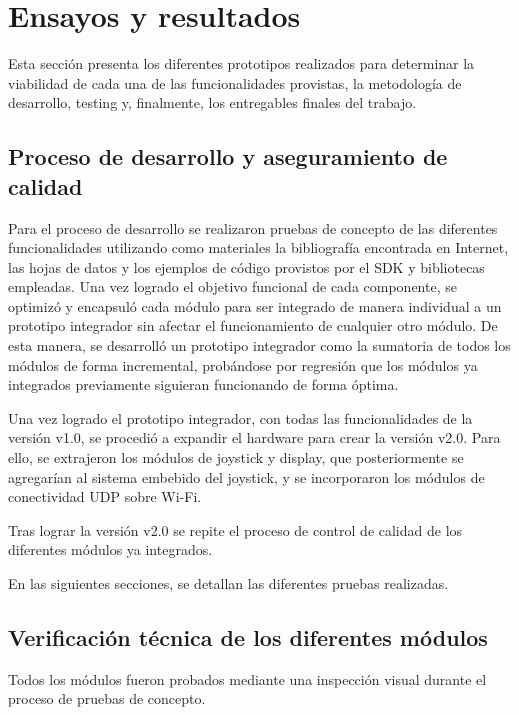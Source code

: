 
\chapter{Ensayos y resultados} %

\label{Chapter4} %

Esta sección presenta los diferentes prototipos realizados para determinar la viabilidad de cada una de las funcionalidades provistas, la metodología de desarrollo, testing y, finalmente, los entregables finales del trabajo.

\section{Proceso de desarrollo y aseguramiento de calidad}
\label{sec:pruebasHW}

Para el proceso de desarrollo se realizaron pruebas de concepto de las diferentes funcionalidades utilizando como materiales la bibliografía encontrada en Internet, las hojas de datos y los ejemplos de código provistos por el SDK y bibliotecas empleadas. Una vez logrado el objetivo funcional de cada componente, se optimizó y encapsuló cada módulo para ser integrado de manera individual a un prototipo integrador sin afectar el funcionamiento de cualquier otro módulo.
De esta manera, se desarrolló un prototipo integrador como la sumatoria de todos los módulos de forma incremental, probándose por regresión que los módulos ya integrados previamente siguieran funcionando de forma óptima.

Una vez logrado el prototipo integrador, con todas las funcionalidades de la versión v1.0, se procedió a expandir el hardware para crear la versión v2.0. Para ello, se extrajeron los módulos de joystick y display, que posteriormente se agregarían al sistema embebido del joystick, y se incorporaron los módulos de conectividad UDP sobre Wi-Fi.

Tras lograr la versión v2.0 se repite el proceso de control de calidad de los diferentes módulos ya integrados.

En las siguientes secciones, se detallan las diferentes pruebas realizadas.

\section{Verificación técnica de los diferentes módulos}
Todos los módulos fueron probados mediante una inspección visual durante el proceso de pruebas de concepto.

